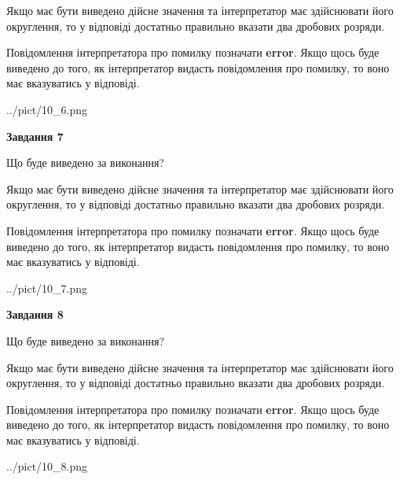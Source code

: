 \documentclass[12pt, ukrainian]{article}
\begin{document}
{\begin {Large}
Якщо має бути виведено дійсне значення та інтерпретатор має здійснювати його округлення, 
то у відповіді достатньо правильно вказати два дробових розряди.

Повідомлення інтерпретатора про помилку позначати \textbf{error}.
Якщо щось буде виведено до того, як інтерпретатор видасть повідомлення про помилку, 
то воно має вказуватись у відповіді. \par

\begin{center}
	{../pict/10_6.png}
\end{center}
\newpage

{\begin {center}\textbf{Завдання 7}\end {center}}\par
Що буде виведено за виконання? \par

Якщо має бути виведено дійсне значення та інтерпретатор має здійснювати його округлення, 
то у відповіді достатньо правильно вказати два дробових розряди.

Повідомлення інтерпретатора про помилку позначати \textbf{error}.
Якщо щось буде виведено до того, як інтерпретатор видасть повідомлення про помилку, 
то воно має вказуватись у відповіді. \par

\begin{center}
	{../pict/10_7.png}
\end{center}
\newpage

{\begin {center}\textbf{Завдання 8}\end {center}}\par
Що буде виведено за виконання? \par

Якщо має бути виведено дійсне значення та інтерпретатор має здійснювати його округлення, 
то у відповіді достатньо правильно вказати два дробових розряди.

Повідомлення інтерпретатора про помилку позначати \textbf{error}.
Якщо щось буде виведено до того, як інтерпретатор видасть повідомлення про помилку, 
то воно має вказуватись у відповіді. \par

\begin{center}
	{../pict/10_8.png}
\end{center}
\newpage


\end{Large}}
\end{document}

